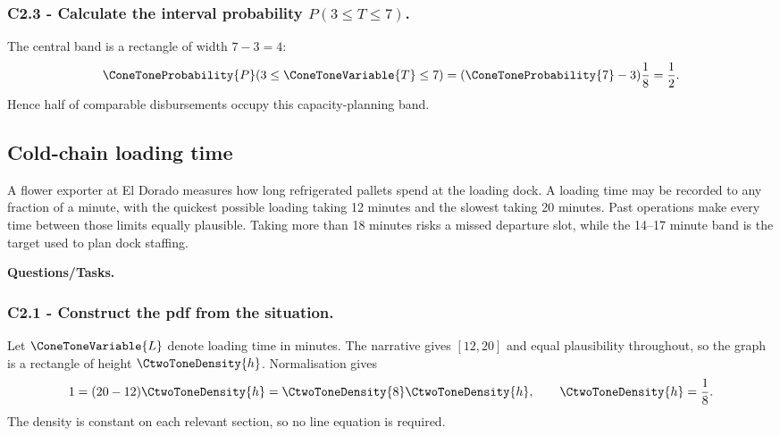 \subsubsection*{C2.3 - Calculate the interval probability $P(3\le T\le7)$.}
\label{subsec:c2-uniform-service-c}
The central band is a rectangle of width $7-3=4$:
\[
 \ConeToneProbability{P}(3\le \ConeToneVariable{T}\le7)=(\ConeToneProbability{7}-3)\frac18=\frac12.
\]
Hence half of comparable disbursements occupy this capacity-planning band.

\subsection{Cold-chain loading time}\label{sec:c2-uniform-cold-chain}
A flower exporter at El Dorado measures how long refrigerated pallets spend at
the loading dock.  A loading time may be recorded to any fraction of a minute,
with the quickest possible loading taking 12 minutes and the slowest taking 20
minutes.  Past operations make every time between those limits equally
plausible.  Taking more than 18 minutes risks a missed departure slot, while
the 14--17 minute band is the target used to plan dock staffing.

\begingroup{}
\endgroup

\textbf{Questions/Tasks.}
\begin{enumerate}
\end{enumerate}

\subsubsection*{C2.1 - Construct the pdf from the situation.}
\label{subsec:c2-uniform-cold-chain-a}
Let $\ConeToneVariable{L}$ denote loading time in minutes.  The narrative gives  $[12,20]$
and equal plausibility throughout, so the graph is a rectangle of height $\CtwoToneDensity{h}$.
Normalisation gives
\[
 1=(20-12)\CtwoToneDensity{h}=\CtwoToneDensity{8}\CtwoToneDensity{h},\qquad \CtwoToneDensity{h}=\frac18.
\]
The density is constant on each relevant section, so no line equation is required.

